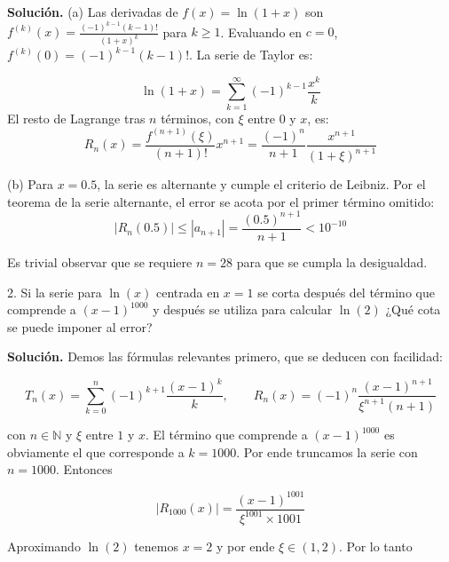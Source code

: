 \documentclass[12pt]{article}
\begin{document}
\textbf{Solución.} (a) Las derivadas de $f(x) = \ln(1+x)$ son $f^{(k)}(x) =
\frac{(-1)^{k-1}(k-1)!}{(1+x)^k}$ para $k \geq 1$. Evaluando en $c=0$,
$f^{(k)}(0) = (-1)^{k-1}(k-1)!$. La serie de Taylor es:

\begin{equation*}
    \ln(1+x) = \sum_{k=1}^{\infty} (-1)^{k-1} \frac{x^k}{k}
\end{equation*}
El resto de Lagrange tras $n$ términos, con $\xi$ entre $0$ y $x$, es:
\begin{equation*}
    R_n(x) = \frac{f^{(n+1)}(\xi)}{(n+1)!} x^{n+1} = \frac{(-1)^{n}}{n+1} \frac{x^{n+1}}{(1+\xi)^{n+1}}
\end{equation*}

(b) Para $x = 0.5$, la serie es alternante y cumple el criterio de Leibniz. Por el teorema de la serie alternante, el error se acota por el primer término omitido:
\begin{equation*}
    |R_n(0.5)| \leq |a_{n+1}| = \frac{(0.5)^{n+1}}{n+1} < 10^{-10}
\end{equation*}

Es trivial observar que se requiere $n=28$ para que se cumpla la desigualdad.




\pagebreak 

\begin{myframe}
    2. Si la serie para $\ln(x)$ centrada en $x = 1$ se corta después del término que comprende a $(x-1)^{1000}$ y después se utiliza para calcular $\ln(2)$ ¿Qué cota se puede imponer al error?
\end{myframe}

\textbf{Solución.} Demos las fórmulas relevantes primero, que se deducen con
facilidad:

\begin{equation*}
    T_n(x) = \sum_{k=0}^n (-1)^{k+1} \frac{(x-1)^k}{k}, \qquad R_n(x) = (-1)^n
    \frac{(x-1)^{n+1}}{\xi^{n+1}(n+1)}
\end{equation*}

con $n \in \mathbb{N}$ y $\xi$ entre $1$ y $x$. El término que comprende a
$(x-1)^{1000}$ es obviamente el que corresponde a $k = 1000$. Por ende truncamos
la serie con $n = 1000$. Entonces 

\begin{equation*}
    \left| R_{1000}(x) \right| = \frac{(x-1)^{1001}}{\xi^{1001} \times 1001}
\end{equation*}

Aproximando $\ln(2)$ tenemos $x = 2$ y por ende $\xi \in (1, 2)$. Por lo tanto 
\end{document}
